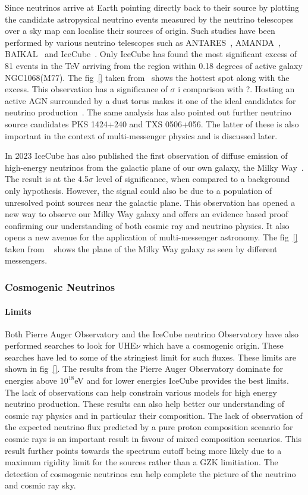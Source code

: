   Since neutrinos arrive at Earth pointing directly back to their source by plotting the candidate astropysical neutrino events measured by the neutrino telescopes over a sky map can localise their sources of origin. Such studies have been performed by various neutrino telescopes such as ANTARES~\cite{}, AMANDA~\cite{}, BAIKAL~\cite{} and IceCube~\cite{}. Only IceCube has found the most significant excess of 81 events in the TeV arriving from the region within 0.18 degrees of active galaxy NGC1068(M77). The fig~\ref{} taken from~\cite{} shows the hottest spot along with the excess. This observation has a significance of $\sigma$ i comparison with ?. Hosting an active AGN surrounded by a dust torus makes it one of the ideal candidates for neutrino production~\cite{}. The same analysis has also pointed out further neutrino source candidates PKS 1424+240 and TXS 0506+056. The latter of these is also important in the context of multi-messenger physics and is discussed later. 

  In 2023 IceCube has also published the first observation of diffuse emission of high-energy neutrinos from the galactic plane of our own galaxy, the Milky Way~\cite{}. The result is at the 4.5$\sigma$ level of significance, when compared to a background only hypothesis. However, the signal could also be due to a population of unresolved point sources near the galactic plane. This observation has opened a new way to observe our Milky Way galaxy and offers an evidence based proof confirming our understanding of both cosmic ray and neutrino physics. It also opens a new avenue for the application of multi-messenger astronomy. The fig~\ref{} taken from ~\cite{} shows the plane of the Milky Way galaxy as seen by different messengers.
  
\subsubsection*{Cosmogenic Neutrinos}

  \paragraph{Limits}
    \label{subsubsec:CosmoNuLimits}
  Both Pierre Auger Observatory and the IceCube neutrino Observatory have also performed searches to look for UHE$\nu$ which have a cosmogenic origin. These searches have led to some of the stringiest limit for such fluxes. These limits are shown in fig~\ref{}. The results from the Pierre Auger Observatory dominate for energies above $10^{18}$eV and for lower energies IceCube provides the best limits. The lack of observations can help constrain various models for high energy neutrino production. These results can also help better our understanding of cosmic ray physics and in particular their composition. The lack of observation of the expected neutrino flux predicted by a pure proton composition scenario for cosmic rays is an important result in favour of mixed composition scenarios. This result further points towards the spectrum cutoff being more likely due to a maximum rigidity limit for the sources rather than a GZK limitiation. The detection of cosmogenic neutrinos can help complete the picture of the neutrino and cosmic ray sky. 

